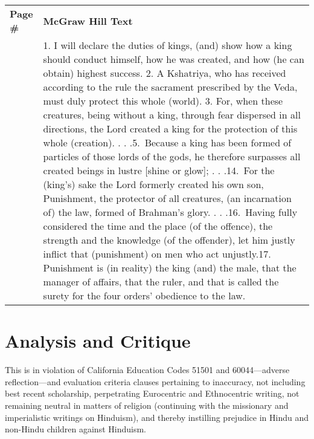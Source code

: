 \begin{longtable}{|>{\raggedleft}p{1.5cm}|p{8.5cm}|}
\multicolumn{2}{c}{\textbf{Table: 5}}\\ 
\hline
\textbf{Page \#} & \textbf{McGraw Hill Text} \tabularnewline
\hline 
281 & 1. I will declare the duties of kings, (and) show how a king should conduct himself, how he was created, and how (he can obtain) highest success. 2. A Kshatriya, who has received according to the rule the sacrament prescribed by the Veda, must duly protect this whole (world). 3. For, when these creatures, being without a king, through fear dispersed in all directions, the Lord created a king for the protection of this whole (creation). . . .5.\ Because a king has been formed of particles of those lords of the gods, he therefore surpasses all created beings in lustre [shine or glow]; . . .14.\ For the (king’s) sake the Lord formerly created his own son, Punishment, the protector of all creatures, (an incarnation of) the law, formed of Brahman’s glory. . . .16.\ Having fully considered the time and the place (of the offence), the strength and the knowledge (of the offender), let him justly inflict that (punishment) on men who act unjustly.17. Punishment is (in reality) the king (and) the male, that the manager of affairs, that the ruler, and that is called the surety for the four orders’ obedience to the law. \tabularnewline
\hline
\end{longtable}

\section*{Analysis and Critique} 

This is in violation of California Education Codes 51501 and 60044—adverse reflection—and evaluation criteria clauses pertaining to inaccuracy, not including best recent scholarship, perpetrating Eurocentric and Ethnocentric writing, not remaining neutral in matters of religion (continuing with the missionary and imperialistic writings on Hinduism), and thereby instilling prejudice in Hindu and non-Hindu children against Hinduism.

